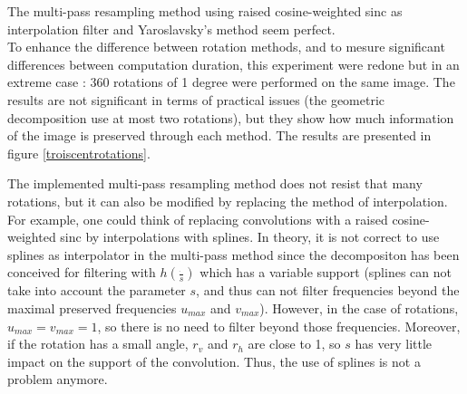  The multi-pass resampling method using raised cosine-weighted sinc as interpolation filter and Yaroslavsky's method seem perfect.\\

	To enhance the difference between rotation methods, and to mesure significant differences between computation duration, this experiment were redone but in an extreme case : 360 rotations of 1 degree were performed on the same image. The results are not significant in terms of practical issues (the geometric decomposition use at most two rotations), but they show how much information of the image is preserved through each method. The results are presented in figure \ref{troiscentrotations}.
	
	The implemented multi-pass resampling method does not resist that many rotations, but it can also be modified by replacing the method of interpolation. For example, one could think of replacing convolutions with a raised cosine-weighted sinc by interpolations with splines.
In theory, it is not correct to use splines as interpolator in the multi-pass method since the decompositon has been conceived for filtering with $h(\frac{\dot{}}{s})$ which has a variable support (splines can not take into account the parameter $s$, and thus can not filter frequencies beyond the maximal preserved frequencies $u_{max}$ and $v_{max}$). However, in the case of rotations, $u_{max}=v_{max}=1$, so there is no need to filter beyond those frequencies. Moreover, if the rotation has a small angle, $r_v$ and $r_h$ are close to 1, so $s$ has very little impact on the support of the convolution. Thus, the use of splines is not a problem anymore.

\label{pleinsderotations}

